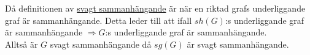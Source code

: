 Då definitionen av \underline{svagt sammanhängande} är när en riktad grafs underliggande graf är sammanhängande.
Detta leder till att ifall $sh(G)$:s underliggande graf är sammanhängande $\Rightarrow G$:s underliggande graf är sammanhängande.\\
Alltså är $G$ svagt sammanhängande då $sg(G)$ är svagt sammanhängande.